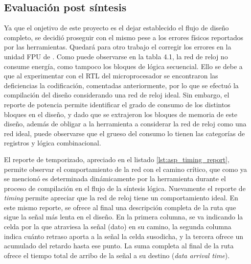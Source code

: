 \subsection{Evaluación post síntesis}

Ya que el onjetivo de este proyecto es el dejar establecido el flujo de diseño completo, se decidió proseguir con el mismo pese a los errores físicos reportados por las herramientas. Quedará para otro trabajo el corregir los errores en la unidad FPU de \cite{Francis2016}.
Como puede observarse en la tabla 4.1, la red de reloj no consume energía, como tampoco los bloques de lógica secuencial. Ello se debe a que al experimentar con el RTL del microprocesador se encontraron las deficiencias la codificación, comentadas anteriormente, por lo que se efectuó la compilación del diseño considerando una red de reloj ideal. Sin embargo, el reporte de potencia permite identificar el grado de consumo de los distintos bloques en el diseño, y dado que se extrajeron los bloques de memoria de este diseño, además de obligar a la herramienta a considerar la red de reloj como una red ideal, puede observarse que el grueso del consumo lo tienen las categorías de registros y lógica combinacional.

El reporte de temporizado, apreciado en el listado \ref{lst:asp_timing_report}, permite observar el comportamiento de la red con el camino crítico, que como ya se mencionó es determinada dinámicamente por la herramienta durante el proceso de compilación en el flujo de la síntesis lógica. Nuevamente el reporte de \textit{timing} permite apreciar que la red de reloj tiene un comportamiento ideal. En este mismo reporte, se ofrece al final una descripción completa de la ruta que sigue la señal más lenta en el diseño. En la primera columna, se va indicando la celda por la que atraviesa la señal (dato) en su camino, la segunda columna indica cuánto retraso aporta a la señal la celda susodicha, y la tercera ofrece un acumulado del retardo hasta ese punto. La suma completa al final de la ruta ofrece el tiempo total de arribo de la señal a su destino (\textit{data arrival time}).


